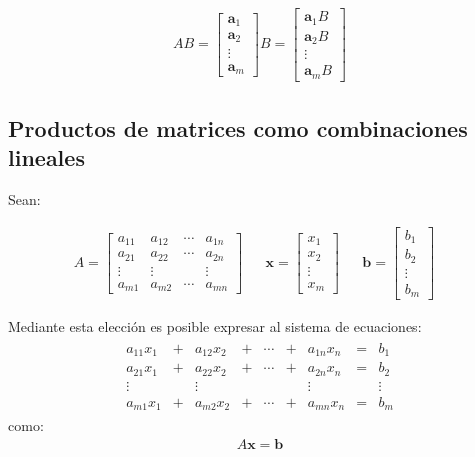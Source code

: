 \documentclass[a4paper,12pt]{article}
\begin{document}
\begin{align*}
  AB = \begin{bmatrix}
    \textbf{a}_1 \\
    \textbf{a}_2 \\
    \vdots       \\
    \textbf{a}_m
  \end{bmatrix} B = \begin{bmatrix}
    \textbf{a}_1B \\
    \textbf{a}_2B \\
    \vdots        \\
    \textbf{a}_mB
  \end{bmatrix}
\end{align*}

\subsection{Productos de matrices como combinaciones lineales}

Sean:

\begin{align*}
  A = \begin{bmatrix}
    a_{11}& a_{12}& \cdots& a_{1n}\\
    a_{21}& a_{22}& \cdots& a_{2n}\\
    \vdots&\vdots &       &\vdots \\
    a_{m1}& a_{m2}& \cdots& a_{mn}
  \end{bmatrix} &
  & \textbf{x} = \begin{bmatrix}
    x_1    \\
    x_2    \\
    \vdots \\
    x_m
  \end{bmatrix} &
  & \textbf{b} = \begin{bmatrix}
    b_1    \\
    b_2    \\
    \vdots \\
    b_m
  \end{bmatrix} &
\end{align*}

Mediante esta elección es posible expresar al sistema de ecuaciones:
\begin{align*}
  \begin{matrix}
    a_{11}x_1 &+& a_{12}x_2 &+& \cdots &+& a_{1n}x_n &=& b_1     \\
    a_{21}x_1 &+& a_{22}x_2 &+& \cdots &+& a_{2n}x_n &=& b_2     \\
    \vdots    & &\vdots     & &        & &\vdots     & & \vdots\\
    a_{m1}x_1 &+& a_{m2}x_2 &+& \cdots &+& a_{mn}x_n &=& b_m
  \end{matrix}
\end{align*}
como:
\begin{align*}
  A\textbf{x}=\textbf{b}
\end{align*}
\end{document}
